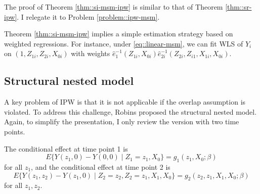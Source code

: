 The proof of Theorem \ref{thm::si-msm-ipw} is similar to that of Theorem \ref{thm::sr-ipw}. I relegate it to Problem \ref{problem::ipw-msm}.


 Theorem \ref{thm::si-msm-ipw} implies a simple estimation strategy based on weighted regressions. For instance, under \eqref{eq::linear-msm}, we can fit WLS of $Y_i$ on $(1,Z_{1i}, Z_{2i}, X_{0i})$ with weights $\hat{e}_{1}^{-1}(Z_{1i}, X_{0i})  \hat{e}_{2i}^{-1}(Z_{2i}, Z_{i1}, X_{1i}, X_{0i})$. 

 



\subsection{Structural nested model}



A key problem of IPW is that it is not applicable if the overlap assumption is violated.  To address this challenge, Robins proposed the structural nested model. Again, to simplify the presentation, I only review the version with two time points.

\begin{definition}
\label{def::snm}
The conditional effect at time point 1 is
$$
E\{  Y(z_1,0) - Y(0,0) \mid  Z_1=z_1,  X_0 \} = g_1( z_1, X_0; \beta)   
$$
for all  $z_1$, 
and the conditional effect at time point 2 is 
$$
E\{  Y(z_1,z_2) - Y(z_1,0) \mid Z_2=z_2,Z_2=z_1,  X_1,  X_0 \} = g_2(z_2, z_1,  X_1,  X_0; \beta) 
$$
for all $ z_1, z_2.$
\end{definition}




